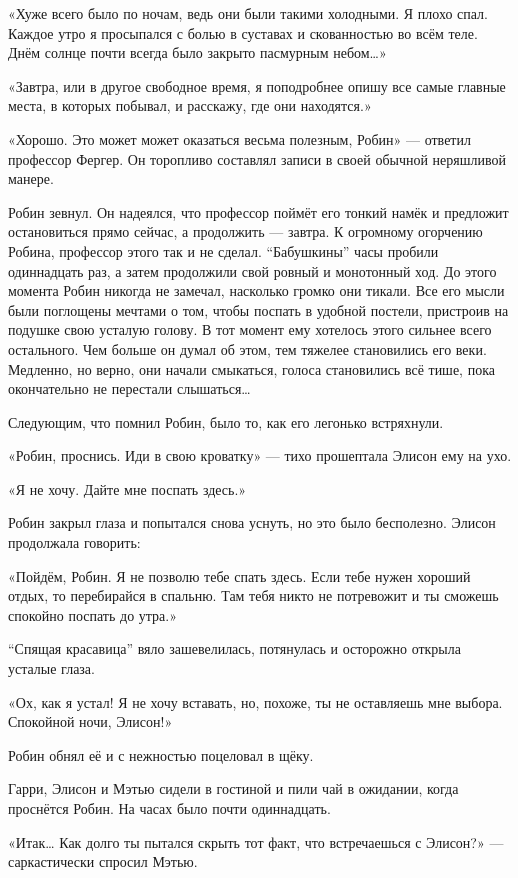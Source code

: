 \documentclass[a5paper, 9pt,
final, openany, twoside=true]{memoir}
\begin{document}
«Хуже всего было по ночам, ведь они были такими холодными. Я плохо спал. Каждое утро я просыпался с болью в суставах и скованностью во всём теле. Днём солнце почти всегда было закрыто пасмурным небом…»

«Завтра, или в другое свободное время, я поподробнее опишу все самые главные места, в которых побывал, и расскажу, где они находятся.»

«Хорошо. Это может может оказаться весьма полезным, Робин» — ответил профессор Фергер. Он торопливо составлял записи в своей обычной неряшливой манере.

Робин зевнул. Он надеялся, что профессор поймёт его тонкий намёк и предложит остановиться прямо сейчас, а продолжить — завтра. К огромному огорчению Робина, профессор этого так и не сделал. ``Бабушкины'' часы пробили одиннадцать раз, а затем продолжили свой ровный и монотонный ход. До этого момента Робин никогда не замечал, насколько громко они тикали. Все его мысли были поглощены мечтами о том, чтобы поспать в удобной постели, пристроив на подушке свою усталую голову. В тот момент ему хотелось этого сильнее всего остального. Чем больше он думал об этом, тем тяжелее становились его веки. Медленно, но верно, они начали смыкаться, голоса становились всё тише, пока окончательно не перестали слышаться…

Следующим, что помнил Робин, было то, как его легонько встряхнули.

«Робин, проснись. Иди в свою кроватку» — тихо прошептала Элисон ему на ухо.

«Я не хочу. Дайте мне поспать здесь.»

Робин закрыл глаза и попытался снова уснуть, но это было бесполезно. Элисон продолжала говорить:

«Пойдём, Робин. Я не позволю тебе спать здесь. Если тебе нужен хороший отдых, то перебирайся в спальню. Там тебя никто не потревожит и ты сможешь спокойно поспать до утра.»

``Спящая красавица'' вяло зашевелилась, потянулась и осторожно открыла усталые глаза.

«Ох, как я устал! Я не хочу вставать, но, похоже, ты не оставляешь мне выбора. Спокойной ночи, Элисон!»

Робин обнял её и с нежностью поцеловал в щёку.\bigskip

Гарри, Элисон и Мэтью сидели в гостиной и пили чай в ожидании, когда проснётся Робин. На часах было почти одиннадцать.

«Итак… Как долго ты пытался скрыть тот факт, что встречаешься с Элисон?» — саркастически спросил Мэтью.
\end{document}
